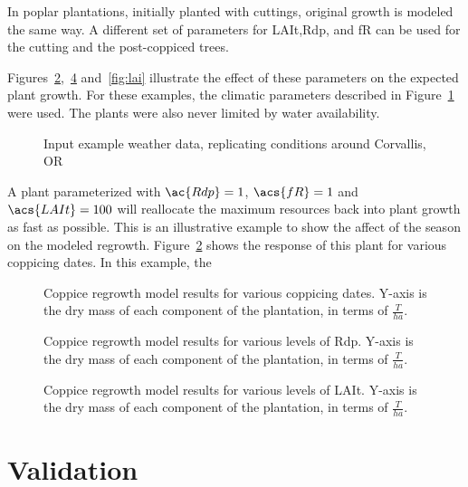 \documentclass[10pt]{article}
\begin{document}
In poplar plantations, initially planted with cuttings, original
growth is modeled the same way.  A different set of parameters for
\ac{LAIt},\ac{Rdp}, and \acs{fR} can be used for the cutting and the
post-coppiced trees.

Figures~\ref{fig:date},~\ref{fig:rdp} and~\ref{fig:lai} illustrate the
effect of these parameters on the expected plant growth.  For these
examples, the climatic parameters described in
Figure~\ref{fig:weather} were used.  The plants were also never
limited by water availability.

\begin{figure}
  \centering
  
  \caption{Input example weather data, replicating conditions around
    Corvallis, OR}
  \label{fig:weather}
\end{figure}

A plant parameterized with $\ac{Rdp}=1$, $\acs{fR}=1$ and
$\acs{LAIt}=100$ will reallocate the maximum resources back into plant
growth as fast as possible.  This is an illustrative example to show
the affect of the season on the modeled regrowth.
Figure~\ref{fig:date} shows the response of this plant for various
coppicing dates.  In this example, the

\begin{figure}
  \centering
  
  \caption{Coppice regrowth model results for various coppicing dates.
    Y-axis is the dry mass of each component of the plantation, in
    terms of $\frac{T}{ha}$.}
  \label{fig:date}
\end{figure}

\begin{figure}
  \centering
  
  \caption{Coppice regrowth model results for various levels of \acf{Rdp}.
    Y-axis is the dry mass of each component of the plantation, in
    terms of $\frac{T}{ha}$.}
  \label{fig:rdp}
\end{figure}

\begin{figure}
  \centering
  
  \caption{Coppice regrowth model results for various levels of \acf{LAIt}.
    Y-axis is the dry mass of each component of the plantation, in
    terms of $\frac{T}{ha}$.}
  \label{fig:rdp}
\end{figure}

\section*{Validation}
\label{sec:validation}
\end{document}
